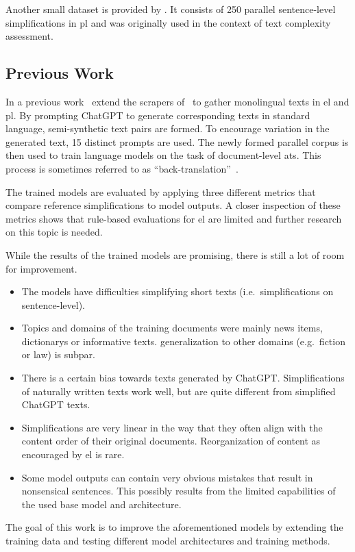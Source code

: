 Another small dataset is provided by \textcite{naderi2019subjective}.
It consists of 250 parallel sentence-level simplifications in \gls{pl} and was originally used in the context of text complexity assessment.


\subsection{Previous Work}\label{subsec:previous-work}

In a previous work~\textcite{klöser2024german} extend the scrapers of~\textcite{Ansch_tz_2023} to gather monolingual texts in \gls{el} and \gls{pl}.
By prompting ChatGPT to generate corresponding texts in standard language, semi-synthetic text pairs are formed.
To encourage variation in the generated text, 15 distinct prompts are used.
The newly formed parallel corpus is then used to train language models on the task of document-level \gls{ats}.
This process is sometimes referred to as \enquote{back-translation}~\autocite{sennrich-etal-2016-improving}.

The trained models are evaluated by applying three different metrics that compare reference simplifications to model outputs.
A closer inspection of these metrics shows that rule-based evaluations for \gls{el} are limited and further research on this topic is needed.

While the results of the trained models are promising, there is still a lot of room for improvement.
\begin{itemize}[noitemsep]
    \item The models have difficulties simplifying short texts (i.e.\ simplifications on sentence-level).
    \item Topics and domains of the training documents were mainly news items, dictionarys or informative texts.
    \gls{generalization} to other domains (e.g.\ fiction or law) is subpar.
    \item There is a certain bias towards texts generated by ChatGPT.
    Simplifications of naturally written texts work well, but are quite different from simplified ChatGPT texts.
    \item Simplifications are very linear in the way that they often align with the content order of their original documents.
    Reorganization of content as encouraged by \gls{el} is rare.
    \item Some model outputs can contain very obvious mistakes that result in nonsensical sentences.
    This possibly results from the limited capabilities of the used base model and architecture.
\end{itemize}
The goal of this work is to improve the aforementioned models by extending the training data and testing different model architectures and training methods.

